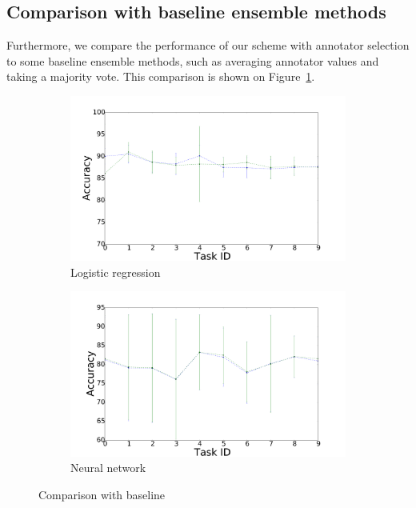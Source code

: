 \documentclass{llncs}
\begin{document}
\subsection{Comparison with baseline ensemble methods}

Furthermore, we compare the performance of our scheme with annotator selection to some baseline ensemble methods, such as averaging annotator values and taking a majority vote. %
This comparison is shown on Figure~\ref{fig:baseline}.

\begin{figure}[!htb]
    \centering
    \begin{subfigure}[b]{0.45\textwidth}
        \includegraphics[width=\textwidth]{figures/comp_average}
        \caption{Logistic regression}
    \end{subfigure}
    \begin{subfigure}[b]{0.45\textwidth}
        \includegraphics[width=\textwidth]{figures/comp_average_mlp}
        \caption{Neural network}
    \end{subfigure}
    \caption{Comparison with baseline}
    \label{fig:baseline}
\end{figure}
\end{document}
